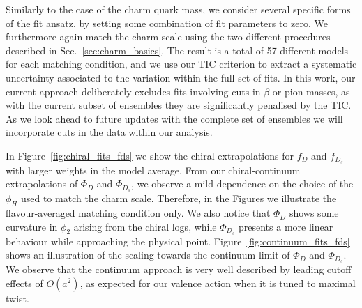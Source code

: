 Similarly to the case of the charm quark mass, we consider several specific forms of the fit ansatz,
by setting some combination of fit parameters to zero. We furthermore again match the charm scale using
the two different procedures described in Sec.~\ref{sec:charm_basics}. The result is a total
of 57 different models  for each matching condition,
and we use our TIC criterion to extract a systematic uncertainty associated to the variation
within the full set of fits. In this work, our current approach deliberately excludes fits involving cuts in $\beta$ or pion masses, as with the current subset of ensembles they are significantly penalised by the TIC. As we look ahead to future updates with the complete set of ensembles  we will incorporate cuts in the data within our analysis.

In Figure~\ref{fig:chiral_fits_fds} we show the chiral extrapolations for $f_D$ and $f_{D_s}$
with larger weights in the model average.  From our chiral-continuum extrapolations of $\Phi_D$ and $\Phi_{D_s}$, we observe a mild 
dependence on the  choice of the $\phi_H$ used to match the charm scale. Therefore, in the Figures we 
illustrate the flavour-averaged matching condition only. We also notice that $\Phi_D$ shows some 
curvature in $\phi_2$ arising from the chiral logs, while $\Phi_{D_s}$ presents a more linear behaviour 
while approaching the physical point. Figure~\ref{fig:continuum_fits_fds} shows an illustration
of the scaling towards the continuum limit of $\Phi_D$ and $\Phi_{D_{s}}$. We observe that the continuum 
approach is very well described by leading cutoff effects of $O(a^2)$, as expected for our valence action when it is tuned to maximal twist.
%
